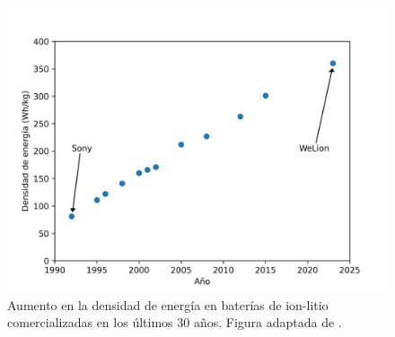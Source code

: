 \begin{figure}[h!]
    \centering
    \includegraphics[width=.8\textwidth]{Introduccion/baterias/whkg.png}
    \caption{Aumento en la densidad de energía en baterías de ion-litio comercializadas
    en los últimos 30 años. Figura adaptada de \cite{li2023700}.}
    \label{fig:whkg}
\end{figure}

